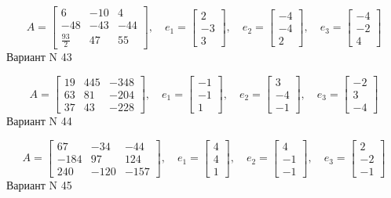 \documentclass[11pt]{report}
\begin{document}
$$A = \left[\begin{matrix}6 & -10 & 4\\-48 & -43 & -44\\\frac{93}{2} & 47 & 55\end{matrix}\right],\quad e_1 = \left[\begin{matrix}2\\-3\\3\end{matrix}\right],\quad e_2 = \left[\begin{matrix}-4\\-4\\2\end{matrix}\right],\quad e_3 = \left[\begin{matrix}-4\\-2\\4\end{matrix}\right]$$Вариант N 43

$$A = \left[\begin{matrix}19 & 445 & -348\\63 & 81 & -204\\37 & 43 & -228\end{matrix}\right],\quad e_1 = \left[\begin{matrix}-1\\-1\\1\end{matrix}\right],\quad e_2 = \left[\begin{matrix}3\\-4\\-1\end{matrix}\right],\quad e_3 = \left[\begin{matrix}-2\\3\\-4\end{matrix}\right]$$Вариант N 44

$$A = \left[\begin{matrix}67 & -34 & -44\\-184 & 97 & 124\\240 & -120 & -157\end{matrix}\right],\quad e_1 = \left[\begin{matrix}4\\4\\1\end{matrix}\right],\quad e_2 = \left[\begin{matrix}4\\-1\\-1\end{matrix}\right],\quad e_3 = \left[\begin{matrix}2\\-2\\-1\end{matrix}\right]$$Вариант N 45
\end{document}
